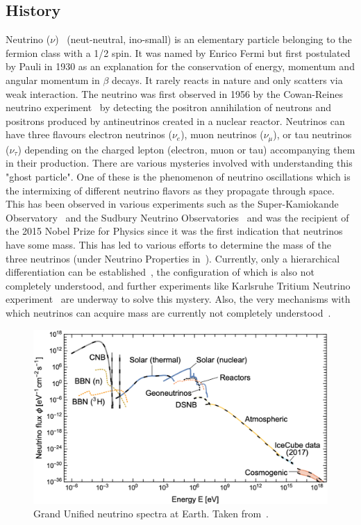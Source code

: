 \subsection{History}
Neutrino ($\nu$)~\cite{10.1063/1.2995181} (neut-neutral, ino-small) is an elementary particle belonging to the fermion class with a 1/2 spin. It was named by Enrico Fermi but first postulated by Pauli in 1930 as an explanation for the conservation of energy, momentum and angular momentum in $\beta$ decays. It rarely reacts in nature and only scatters via weak interaction. The neutrino was first observed in 1956 by the Cowan-Reines neutrino experiment~\cite{PhysRev.92.830} by detecting the positron annihilation of neutrons and positrons produced by antineutrinos created in a nuclear reactor. Neutrinos can have three flavours electron neutrinos ($\nu_e$), muon neutrinos ($\nu_{\mu}$), or tau neutrinos ($\nu_{\tau}$) depending on the charged lepton (electron, muon or tau) accompanying them in their production. There are various mysteries involved with understanding this "ghost particle". One of these is the phenomenon of neutrino oscillations which is the intermixing of different neutrino flavors as they propagate through space. This has been observed in various experiments such as the Super-Kamiokande Observatory~\cite{Fukuda_1998} and the Sudbury Neutrino Observatories~\cite{BELLERIVE201630} and was the recipient of the 2015 Nobel Prize for Physics since it was the first indication that neutrinos have some mass. This has led to various efforts to determine the mass of the three neutrinos (under Neutrino Properties in~\cite{ParticleDataGroup:2024cfk}). Currently, only a hierarchical differentiation can be established~\cite{Qian_2015}, the configuration of which is also not completely understood, and further experiments like Karlsruhe Tritium Neutrino experiment~\cite{aker2024directneutrinomassmeasurementbased} are underway to solve this mystery. Also, the very mechanisms with which neutrinos can acquire mass are currently not completely understood~\cite{CERN_courier_nu_mass}. 
\begin{figure}[t!]
  \centering
  \includegraphics[width=14.5cm]{thesis_figures/CRnNu/Neutrino spectra.jpg}
  \caption{Grand Unified neutrino spectra at Earth. Taken from~\cite{Vitagliano:2019yzm}.}
  \label{fig:Neutrino-spectra}
\end{figure}

